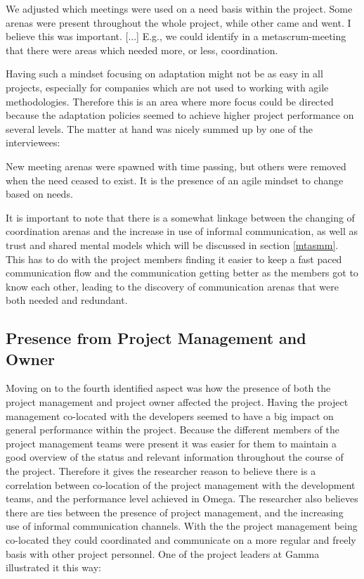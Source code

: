 \begin{fancyquotes}
We adjusted which meetings were used on a need basis within the project. Some arenas were present throughout the whole project, while other came and went. I believe this was important. [...] E.g., we could identify in a metascrum-meeting that there were areas which needed more, or less, coordination.
\end{fancyquotes}

Having such a mindset focusing on adaptation might not be as easy in all projects, especially for companies which are not used to working with agile methodologies. Therefore this is an area where more focus could be directed because the adaptation policies seemed to achieve higher project performance on several levels. The matter at hand was nicely summed up by one of the interviewees:

\begin{fancyquotes}
New meeting arenas were spawned with time passing, but others were removed when the need ceased to exist. It is the presence of an agile mindset to change based on needs.
\end{fancyquotes}

It is important to note that there is a somewhat linkage between the changing of coordination arenas and the increase in use of informal communication, as well as trust and shared mental models which will be discussed in section \ref{mtasmm}. This has to do with the project members finding it easier to keep a fast paced communication flow and the communication getting better as the members got to know each other, leading to the discovery of communication arenas that were both needed and redundant.

\subsection{Presence from Project Management and Owner}

Moving on to the fourth identified aspect was how the presence of both the project management and project owner affected the project. Having the project management co-located with the developers seemed to have a big impact on general performance within the project. Because the different members of the project management teams were present it was easier for them to maintain a good overview of the status and relevant information throughout the course of the project. Therefore it gives the researcher reason to believe there is a correlation between co-location of the project management with the development teams, and the performance level achieved in Omega. The researcher also believes there are ties between the presence of project management, and the increasing use of informal communication channels. With the the project management being co-located they could coordinated and communicate on a more regular and freely basis with other project personnel. One of the project leaders at Gamma illustrated it this way:

